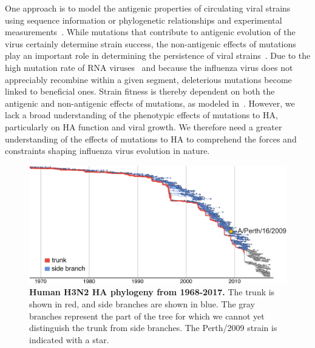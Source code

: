 \documentclass[9pt,twocolumn,twoside]{pnas-new}
\begin{document}
One approach is to model the antigenic properties of circulating viral strains using sequence information or phylogenetic relationships and experimental measurements~\cite{sun2013using,harvey2016identification,neher2016prediction}.
While mutations that contribute to antigenic evolution of the virus certainly determine strain success, the non-antigenic effects of mutations play an important role in determining the persistence of viral strains~\cite{pybus2007phylogenetic,kucharski2011influenza,strelkowa2012clonal,luksza2014predictive,koelle2015effects}.
Due to the high mutation rate of RNA viruses~\cite{holland1982rapid,steinhauer1987rapid,lauring2010quasispecies} and because the influenza virus does not appreciably recombine within a given segment, deleterious mutations become linked to beneficial ones.
Strain fitness is thereby dependent on both the antigenic and non-antigenic effects of mutations, as modeled in~\cite{luksza2014predictive}.
However, we lack a broad understanding of the phenotypic effects of mutations to HA, particularly on HA function and viral growth.
We therefore need a greater understanding of the effects of mutations to HA to comprehend the forces and constraints shaping influenza virus evolution in nature.

\begin{figure}
\centering
\includegraphics[width=\linewidth]{figs/H3N2_phylogeny/H3N2_phylogeny.pdf}
\caption{\label{fig:H3N2_phylogeny}
{\bf Human H3N2 HA phylogeny from 1968-2017.}
The trunk is shown in red, and side branches are shown in blue.
The gray branches represent the part of the tree for which we cannot yet distinguish the trunk from side branches.
The Perth/2009 strain is indicated with a star.
}
\end{figure}
\end{document}
